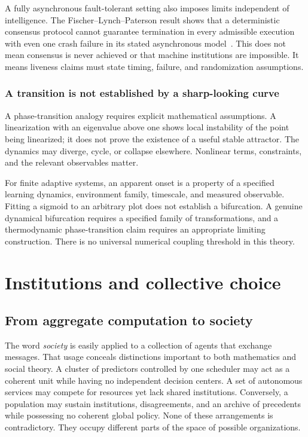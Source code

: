 A fully asynchronous fault-tolerant setting also imposes limits independent of intelligence. The Fischer--Lynch--Paterson result shows that a deterministic consensus protocol cannot guarantee termination in every admissible execution with even one crash failure in its stated asynchronous model~\cite{MS:flp}. This does not mean consensus is never achieved or that machine institutions are impossible. It means liveness claims must state timing, failure, and randomization assumptions.

\subsection{A transition is not established by a sharp-looking curve}
A phase-transition analogy requires explicit mathematical assumptions. A linearization with an eigenvalue above one shows local instability of the point being linearized; it does not prove the existence of a useful stable attractor. The dynamics may diverge, cycle, or collapse elsewhere. Nonlinear terms, constraints, and the relevant observables matter.

For finite adaptive systems, an apparent onset is a property of a specified learning dynamics, environment family, timescale, and measured observable. Fitting a sigmoid to an arbitrary plot does not establish a bifurcation. A genuine dynamical bifurcation requires a specified family of transformations, and a thermodynamic phase-transition claim requires an appropriate limiting construction. There is no universal numerical coupling threshold in this theory.


\chapter{Institutions and collective choice}\label{MS:book:chapter-94}

\section{From aggregate computation to society}\label{MS:sec:society}

The word \emph{society} is easily applied to a collection of agents that exchange messages. That usage conceals distinctions important to both mathematics and social theory. A cluster of predictors controlled by one scheduler may act as a coherent unit while having no independent decision centers. A set of autonomous services may compete for resources yet lack shared institutions. Conversely, a population may sustain institutions, disagreements, and an archive of precedents while possessing no coherent global policy. None of these arrangements is contradictory. They occupy different parts of the space of possible organizations.

